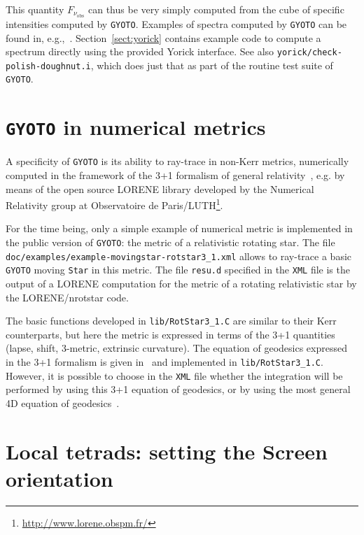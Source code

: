 \documentclass[a4paper,12pt]{article}
\newcommand{\GYOTO}{\texttt{GYOTO}}
\begin{document}
This quantity $F_{\nu_{\mathrm{obs}}}$ can thus be very simply
computed from the cube of specific intensities computed by
\texttt{GYOTO}. Examples of spectra computed by \texttt{GYOTO} can be
found in, e.g.,~\citet{straub12}. Section~\ref{sect:yorick} contains
example code to compute a spectrum directly using the provided Yorick
interface. See also \texttt{yorick/check-polish-doughnut.i}, which
does just that as part of the routine test suite of \GYOTO.


\section{\texttt{GYOTO} in numerical metrics}
\label{3+1}

A specificity of \texttt{GYOTO} is its ability to ray-trace in non-Kerr metrics, numerically computed in the framework of the 3+1 formalism of general relativity~\citep{gourgoulhon12}, e.g. by means of the open source LORENE library developed by the Numerical Relativity group at Observatoire de Paris/LUTH\footnote{\url{http://www.lorene.obspm.fr/}}. 

\begin{sloppypar}
For the time being, only a simple example of numerical metric is implemented in the public version of \texttt{GYOTO}: the metric of a relativistic rotating star. The file \texttt{doc/examples/example-movingstar-rotstar3\_1.xml} allows to ray-trace a basic \texttt{GYOTO} moving \texttt{Star} in this metric. The file \texttt{resu.d} specified in the \texttt{XML} file is the output of a LORENE computation for the metric of a rotating relativistic star by the LORENE/nrotstar code.
\end{sloppypar}

The basic functions developed in \texttt{lib/RotStar3\_1.C} are similar to their Kerr counterparts, but here the metric is expressed in terms of the 3+1 quantities (lapse, shift, 3-metric, extrinsic curvature). The equation of geodesics expressed in the 3+1 formalism is given in~\citet{vincent12a} and implemented in \texttt{lib/RotStar3\_1.C}. However, it is possible to choose in the \texttt{XML} file whether the integration will be performed by using this 3+1 equation of geodesics, or by using the most general 4D equation of geodesics~\citep[see][for a comparison of the two methods]{vincent11a}.

\section{Local tetrads: setting the Screen orientation}
\end{document}
